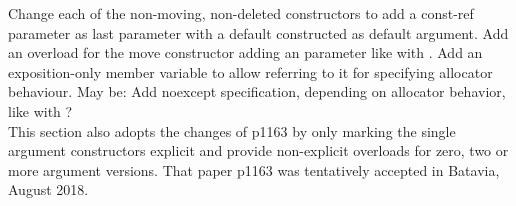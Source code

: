 \documentclass[ebook,11pt,article]{memoir}
\begin{document}
\begin{em}
Change each of the non-moving, non-deleted constructors to add a const-ref  parameter as last parameter with a default constructed  as default argument. Add an overload for the move constructor adding an  parameter like with . Add an exposition-only member variable  to allow referring to it for specifying allocator behaviour. May be: Add noexcept specification, depending on allocator behavior, like with ?\
\\
This section also adopts the changes of p1163 by only marking the single argument constructors explicit and provide non-explicit overloads for zero, two or more argument versions. That paper p1163 was tentatively accepted in Batavia, August 2018.
\end{em}
\end{document}
